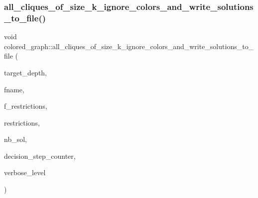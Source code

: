 \subsubsection{\texorpdfstring{all\+\_\+cliques\+\_\+of\+\_\+size\+\_\+k\+\_\+ignore\+\_\+colors\+\_\+and\+\_\+write\+\_\+solutions\+\_\+to\+\_\+file()}{all\_cliques\_of\_size\_k\_ignore\_colors\_and\_write\_solutions\_to\_file()}}
{\footnotesize\ttfamily void colored\+\_\+graph\+::all\+\_\+cliques\+\_\+of\+\_\+size\+\_\+k\+\_\+ignore\+\_\+colors\+\_\+and\+\_\+write\+\_\+solutions\+\_\+to\+\_\+file (\begin{DoxyParamCaption}\item[{\mbox{\hyperlink{galois_8h_a09fddde158a3a20bd2dcadb609de11dc}{I\+NT}}}]{target\+\_\+depth,  }\item[{const \mbox{\hyperlink{galois_8h_ab6cc7b4aeb6ea31aba2b3fbfc83ff5e6}{B\+Y\+TE}} $\ast$}]{fname,  }\item[{\mbox{\hyperlink{galois_8h_a09fddde158a3a20bd2dcadb609de11dc}{I\+NT}}}]{f\+\_\+restrictions,  }\item[{\mbox{\hyperlink{galois_8h_a09fddde158a3a20bd2dcadb609de11dc}{I\+NT}} $\ast$}]{restrictions,  }\item[{\mbox{\hyperlink{galois_8h_a09fddde158a3a20bd2dcadb609de11dc}{I\+NT}} \&}]{nb\+\_\+sol,  }\item[{\mbox{\hyperlink{galois_8h_a09fddde158a3a20bd2dcadb609de11dc}{I\+NT}} \&}]{decision\+\_\+step\+\_\+counter,  }\item[{\mbox{\hyperlink{galois_8h_a09fddde158a3a20bd2dcadb609de11dc}{I\+NT}}}]{verbose\+\_\+level }\end{DoxyParamCaption})}

\mbox{\label{classcolored__graph_a62ecc5d052397b136d676a316f94ff10}} 
